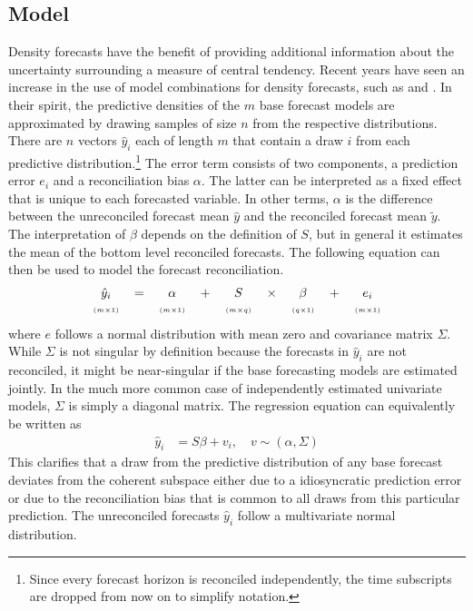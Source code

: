 \documentclass[a4paper,fleqn,11pt]{article}
\begin{document}
\subsection{Model}
Density forecasts have the benefit of providing additional information about the uncertainty surrounding a measure of central tendency. Recent years have seen an increase in the use of model combinations for density forecasts, such as \cite{Kapetanios2015} and \cite{Cesur2016}. In their spirit, the predictive densities of the $m$ base forecast models are approximated by drawing samples of size $n$ from the respective distributions. There are $n$ vectors $\hat{y}_{i}$ each of length $m$ that contain a draw $i$ from each predictive distribution.\footnote{Since every forecast horizon is reconciled independently, the time subscripts are dropped from now on to simplify notation.} The error term consists of two components, a prediction error $e_{i}$ and a reconciliation bias $\alpha$. The latter can be interpreted as a fixed effect that is unique to each forecasted variable. In other terms, $\alpha$ is the difference between the unreconciled forecast mean $\hat{y}$ and the reconciled forecast mean $\tilde{y}$. The interpretation of $\beta$ depends on the definition of $S$, but in general it estimates the mean of the bottom level reconciled forecasts. The following equation can then be used to model the forecast reconciliation.
\begin{align}
\label{eq:main}
\begin{tabular}{ccccccccc}
	$\hat{y}_i$ & $=$ & $\alpha$ & + &$S$ & $\times$ & $\beta$ & $+$ & $e_i$ \\
	$\scriptscriptstyle (m\times 1)$ & & $\scriptscriptstyle (m\times 1)$  & & $ \scriptscriptstyle (m\times q) $ & & $\scriptscriptstyle (q\times 1)$ & & $\scriptscriptstyle (m\times 1)$
\end{tabular}
\end{align}
where $e$ follows a normal distribution with mean zero and covariance matrix $\Sigma$. While $\Sigma$ is not singular by definition because the forecasts in $\hat{y}_{i}$ are not reconciled, it might be near-singular if the base forecasting models are estimated jointly. In the much more common case of independently estimated univariate models, $\Sigma$ is simply a diagonal matrix. The regression equation can equivalently be written as
\begin{align}
	\hat{y}_i &=  S\beta + v_i, \quad v \sim (\alpha,\Sigma)
\end{align}
This clarifies that a draw from the predictive distribution of any base forecast deviates from the coherent subspace either due to a idiosyncratic prediction error or due to the reconciliation bias that is common to all draws from this particular prediction. The unreconciled forecasts $\hat{y}_{i}$ follow a multivariate normal distribution.
\end{document}
